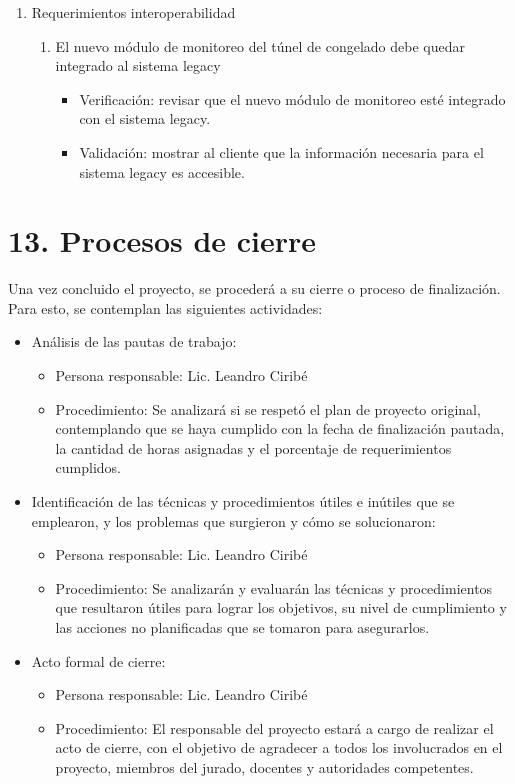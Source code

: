 \documentclass[
11pt, %
]{charter}
\begin{document}
\begin{enumerate}
	\item Requerimientos interoperabilidad
		\begin{enumerate}		
			\item El nuevo módulo de monitoreo del túnel de congelado debe quedar integrado al sistema legacy
			\begin{itemize}
				\item Verificación: revisar que el nuevo módulo de monitoreo esté integrado con el sistema legacy.
				\item Validación: mostrar al cliente que la información necesaria para el sistema legacy es accesible.
			\end{itemize}
		\end{enumerate}
\end{enumerate}

\section{13. Procesos de cierre}    
\label{sec:cierre}

Una vez concluido el proyecto, se procederá a su cierre o proceso de finalización. Para esto, se contemplan las siguientes actividades:
\begin{itemize}
	\item Análisis de las pautas de trabajo:
	\begin{itemize}
		\item Persona responsable: Lic. Leandro Ciribé
		\item Procedimiento: Se analizará si se respetó el plan de proyecto original, contemplando que se haya cumplido con la fecha de finalización pautada, la cantidad de horas asignadas y el porcentaje de requerimientos cumplidos.
	 \end{itemize}

\pagebreak

	\item Identificación de las técnicas y procedimientos útiles e inútiles que se emplearon, y los problemas que surgieron y cómo se solucionaron:
	\begin{itemize}
		\item Persona responsable: Lic. Leandro Ciribé
		\item Procedimiento: Se analizarán y evaluarán las técnicas y procedimientos que resultaron útiles para lograr los objetivos, su nivel de cumplimiento y las acciones no planificadas que se tomaron para asegurarlos.
	 \end{itemize}
	\item Acto formal de cierre:
	\begin{itemize}
		\item Persona responsable: Lic. Leandro Ciribé
		\item Procedimiento: El responsable del proyecto estará a cargo de realizar el acto de cierre, con el objetivo de agradecer a todos los involucrados en el proyecto, miembros del jurado, docentes y autoridades competentes.
	 \end{itemize}
\end{itemize}
\end{document}
